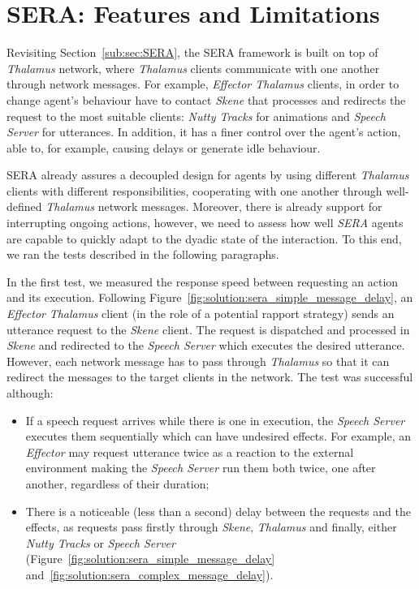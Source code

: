 \section{\acf{SERA}: Features and Limitations}
\label{sub:sera:features_limitations}

Revisiting Section~\ref{sub:sec:SERA}, the \ac{SERA} framework is built on top of \textit{Thalamus} network, where \textit{Thalamus} clients communicate with one another through network messages. For example, \textit{Effector Thalamus} clients, in order to change agent's behaviour have to contact \textit{Skene} that processes and redirects the request to the most suitable clients: \textit{Nutty Tracks} for animations and \textit{Speech Server} for utterances. In addition, it has a finer control over the agent's action, able to, for example, causing delays or generate idle behaviour.

\ac{SERA} already assures a decoupled design for agents by using different \textit{Thalamus} clients with different responsibilities, cooperating with one another through well-defined \textit{Thalamus} network messages. Moreover, there is already support for interrupting ongoing actions, however, we need to assess how well \textit{SERA} agents are capable to quickly adapt to the dyadic state of the interaction. To this end, we ran the tests described in the following paragraphs.

In the first test, we measured the response speed between requesting an action and its execution. Following Figure~\ref{fig:solution:sera_simple_message_delay}, an \textit{Effector} \textit{Thalamus} client (in the role of a potential rapport strategy) sends an utterance request to the \textit{Skene} client. The request is dispatched and processed in \textit{Skene} and redirected to the \textit{Speech Server} which executes the desired utterance. However, each network message has to pass through \textit{Thalamus} so that it can redirect the messages to the target clients in the network. The test was successful although:

\begin{itemize}
	\item If a speech request arrives while there is one in execution, the \textit{Speech Server} executes them sequentially which can have undesired effects. For example, an \textit{Effector} may request utterance twice as a reaction to the external environment making the \textit{Speech Server} run them both twice, one after another, regardless of their duration;
	\item There is a noticeable (less than a second) delay between the requests and the effects, as requests pass firstly through \textit{Skene}, \textit{Thalamus} and finally, either \textit{Nutty Tracks} or \textit{Speech Server} (Figure~\ref{fig:solution:sera_simple_message_delay} and~\ref{fig:solution:sera_complex_message_delay}).
\end{itemize}

